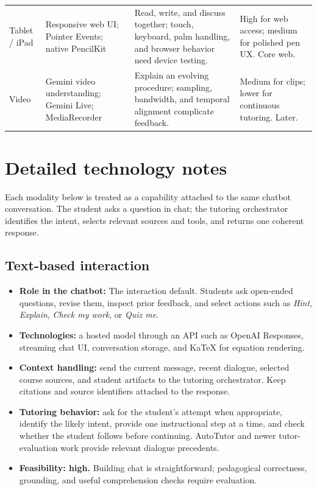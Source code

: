 \documentclass[11pt]{article}
\begin{document}
\begin{longtable}{@{}P{0.15\textwidth}P{0.28\textwidth}P{0.32\textwidth}P{0.17\textwidth}@{}}
\addlinespace
Tablet / iPad & Responsive web UI; Pointer Events; native PencilKit \cite{pointer,pencil} & Read, write, and discuss together; touch, keyboard, palm handling, and browser behavior need device testing. & High for web access; medium for polished pen UX. Core web. \\
\addlinespace
Video & Gemini video understanding; Gemini Live; MediaRecorder \cite{video,live,recorder} & Explain an evolving procedure; sampling, bandwidth, and temporal alignment complicate feedback. & Medium for clips; lower for continuous tutoring. Later. \\
\bottomrule
\end{longtable}
\normalsize

\section{Detailed technology notes}
Each modality below is treated as a capability attached to the same chatbot conversation. The student asks a question in chat; the tutoring orchestrator identifies the intent, selects relevant sources and tools, and returns one coherent response.

\subsection{Text-based interaction}
\begin{itemize}
\item \textbf{Role in the chatbot:} The interaction default. Students ask open-ended questions, revise them, inspect prior feedback, and select actions such as \emph{Hint}, \emph{Explain}, \emph{Check my work}, or \emph{Quiz me}.
\item \textbf{Technologies:} a hosted model through an API such as OpenAI Responses, streaming chat UI, conversation storage, and KaTeX for equation rendering.\cite{text,katex}
\item \textbf{Context handling:} send the current message, recent dialogue, selected course sources, and student artifacts to the tutoring orchestrator. Keep citations and source identifiers attached to the response.
\item \textbf{Tutoring behavior:} ask for the student's attempt when appropriate, identify the likely intent, provide one instructional step at a time, and check whether the student follows before continuing. AutoTutor and newer tutor-evaluation work provide relevant dialogue precedents.\cite{autotutor,tutoreval}
\item \textbf{Feasibility: high.} Building chat is straightforward; pedagogical correctness, grounding, and useful comprehension checks require evaluation.
\end{itemize}
\end{document}
